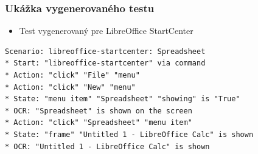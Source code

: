 \documentclass[10pt,xcolor=pdflatex,hyperref={unicode}]{beamer}
\begin{document}
\begin{frame}[fragile]\frametitle{Ukážka vygenerovaného testu}


\begin{itemize}
\item Test vygenerovaný pre LibreOffice StartCenter
\end{itemize}


\begin{center}
\begin{lstlisting}[language=Gherkin]
Scenario: libreoffice-startcenter: Spreadsheet
* Start: "libreoffice-startcenter" via command 
* Action: "click" "File" "menu"
* Action: "click" "New" "menu"
* State: "menu item" "Spreadsheet" "showing" is "True"
* OCR: "Spreadsheet" is shown on the screen
* Action: "click" "Spreadsheet" "menu item"
* State: "frame" "Untitled 1 - LibreOffice Calc" is shown
* OCR: "Untitled 1 - LibreOffice Calc" is shown 
\end{lstlisting}
\end{center}
\end{frame}
\end{document}
